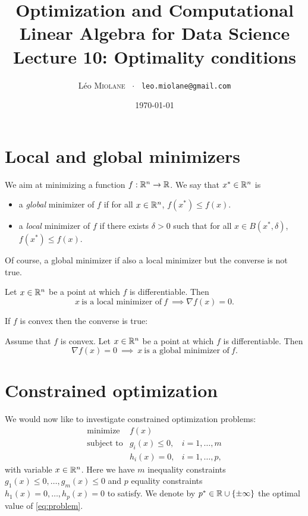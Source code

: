 \documentclass[11pt,nocut]{article}
\title{\vspace{-2.0cm}%
	Optimization and Computational Linear Algebra for Data Science\\
Lecture 10: Optimality conditions}
\author{Léo \textsc{Miolane} \ $\cdot$ \ \texttt{leo.miolane@gmail.com}}
\date{\today}
\begin{document}
\maketitle


\section{Local and global minimizers}

We aim at minimizing a function $f: \mathbb{R}^n \to \mathbb{R}$.
We say that $x^* \in \mathbb{R}^n$ is
\begin{itemize}
	\item a \emph{global} minimizer of $f$ if for all $x \in \mathbb{R}^n$, $f(x^*) \leq f(x)$.
	\item a \emph{local} minimizer of $f$ if there exists $\delta > 0$ such that for all $x \in B(x^*,\delta)$, $f(x^*) \leq f(x)$.
\end{itemize}
Of course, a global minimizer if also a local minimizer but the converse is not true.

\begin{proposition}\label{prop:zero_grad}
	Let $x \in \mathbb{R}^n$ be a point at which $f$ is differentiable. 
	Then
	$$
	x \ \text{is a local minimizer of} \ f \ \implies \nabla f(x) = 0.
	$$
\end{proposition}

If $f$ is convex then the converse is true:

\begin{proposition}\label{prop:zero_grad_convex}
	Assume that $f$ is convex.
	Let $x \in \mathbb{R}^n$ be a point at which $f$ is differentiable. 
	Then
	$$
	\nabla f(x) = 0 \ \implies \ x \ \text{is a global minimizer of} \ f.
	$$
\end{proposition}

\section{Constrained optimization}

We would now like to investigate constrained optimization problems:
\begin{equation}\label{eq:problem}
	\begin{array}{lll}
		\text{minimize} & f(x) & \\
		\text{subject to} & g_i(x) \leq 0, & i=1, \dots, m \\
						  & h_i(x) = 0, & i=1, \dots, p,
	\end{array}
\end{equation}
with variable $x \in \mathbb{R}^n$.
Here we have $m$ inequality constraints $g_1(x) \leq 0, \dots, g_m(x)\leq  0$ and $p$ equality constraints $h_1(x) = 0, \dots, h_p(x) = 0$ to satisfy.
We denote by $p^* \in \mathbb{R} \cup \{\pm \infty\}$ the optimal value of \eqref{eq:problem}.
\end{document}
